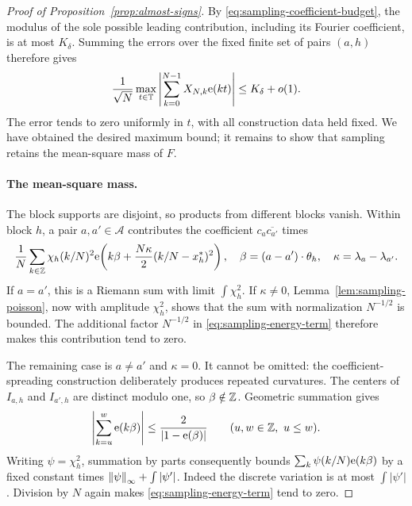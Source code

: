 \begin{proof}[Proof of Proposition~\ref{prop:almost-signs}]
By \eqref{eq:sampling-coefficient-budget}, the modulus of the sole
possible leading contribution, including its Fourier coefficient, is at
most $K_\delta$.  Summing the errors over the fixed finite set of pairs
$(a,h)$ therefore gives
\begin{equation}\label{eq:sampling-uniform-maximum}
 \frac1{\sqrt N}\max_{t\in\mathbb T}
 \left|\sum_{k=0}^{N-1}X_{N,k}\mathrm e(kt)\right|
 \le K_\delta+o(1).
\end{equation}
The error tends to zero uniformly in $t$, with all construction data held
fixed.  We have obtained the desired maximum bound; it remains to show
that sampling retains the mean-square mass of $F$.

\paragraph{The mean-square mass.}
The block supports are disjoint, so products from different blocks vanish.
Within block $h$, a pair $a,a'\in\mathcal A$ contributes the coefficient
$c_a\overline{c_{a'}}$ times
\begin{equation}\label{eq:sampling-energy-term}
 \frac1N\sum_{k\in\mathbb Z}\chi_h(k/N)^2
 \mathrm e\!\left(k\beta+\frac{N\kappa}{2}(k/N-x_h^*)^2\right),
 \quad
 \beta=(a-a')\cdot\theta_h,\quad
 \kappa=\lambda_a-\lambda_{a'}.
\end{equation}
If $a=a'$, this is a Riemann sum with limit $\int\chi_h^2$.
If $\kappa\ne0$, Lemma~\ref{lem:sampling-poisson}, now with amplitude
$\chi_h^2$, shows that the sum with normalization $N^{-1/2}$ is bounded.
The additional factor $N^{-1/2}$ in \eqref{eq:sampling-energy-term}
therefore makes this contribution tend to zero.

The remaining case is $a\ne a'$ and $\kappa=0$.  It cannot be omitted:
the coefficient-spreading construction deliberately produces repeated
curvatures.  The centers of $I_{a,h}$ and $I_{a',h}$ are distinct modulo
one, so $\beta\notin\mathbb Z$.  Geometric summation gives
\[
 \left|\sum_{k=u}^{w}\mathrm e(k\beta)\right|
 \le\frac2{|1-\mathrm e(\beta)|}\qquad(u,w\in\mathbb Z,\ u\le w).
\]
Writing $\psi=\chi_h^2$, summation by parts consequently bounds
$\sum_k\psi(k/N)\mathrm e(k\beta)$ by a fixed constant times
$\left\lVert \psi\right\rVert_\infty+\int|\psi'|$.  Indeed the discrete variation is at
most $\int|\psi'|$.  Division by $N$ again makes
\eqref{eq:sampling-energy-term} tend to zero.


\end{proof}
